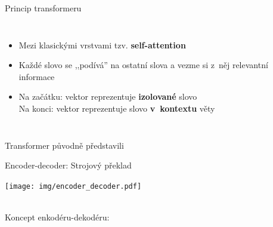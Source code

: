 \documentclass[handout,aspectratio=169,dvipsnames]{beamer}
\begin{document}

\begin{frame}{Princip transformeru}

    \begin{columns}

        \scalebox{.8}{}

        \begin{itemize}[<+->]

            \item Mezi klasickými vrstvami tzv. \textbf{self-attention}

            \item Každé slovo se ,,podívá'' na ostatní slova a vezme si z~něj
                relevantní informace

            \item Na začátku: vektor reprezentuje \textbf{izolované} slovo \\
                Na konci: vektor reprezentuje slovo \textbf{v~kontextu} věty

        \end{itemize}

    \end{columns}

    \vspace{10pt}
    \tiny Transformer původně představili \citet{vaswani2017attention}

\end{frame}


\begin{frame}{Encoder-decoder: Strojový překlad}

    \begin{center}
    \texttt{[image: img/encoder\_decoder.pdf]}
    \end{center}

    \vspace{10pt}

    \centering
     \\
    \tiny Koncept enkodéru-dekodéru: \citep{kalchbrenner2013recurrent,sutskever2014sequence,bahdanaou2015neural}

\end{frame}
\end{document}
